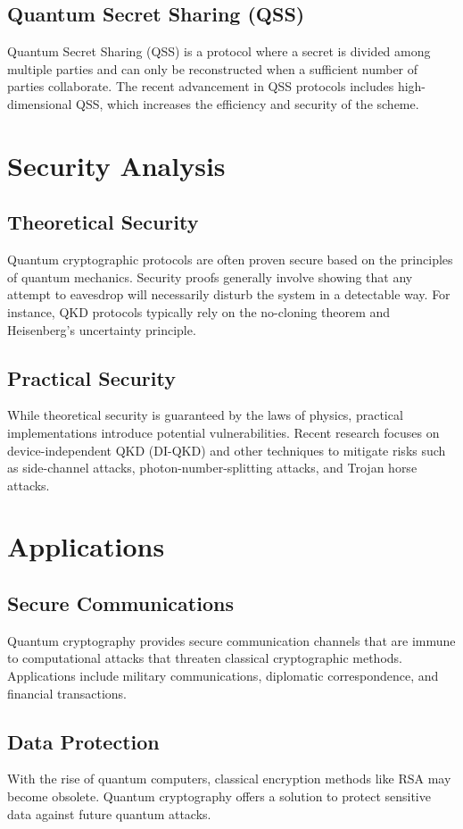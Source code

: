 \documentclass[12pt]{article}
\begin{document}
\subsection{Quantum Secret Sharing (QSS)}
Quantum Secret Sharing (QSS) is a protocol where a secret is divided among multiple parties and can only be reconstructed when a sufficient number of parties collaborate. The recent advancement in QSS protocols includes high-dimensional QSS, which increases the efficiency and security of the scheme.

\section{Security Analysis}
\subsection{Theoretical Security}
Quantum cryptographic protocols are often proven secure based on the principles of quantum mechanics. Security proofs generally involve showing that any attempt to eavesdrop will necessarily disturb the system in a detectable way. For instance, QKD protocols typically rely on the no-cloning theorem and Heisenberg's uncertainty principle.

\subsection{Practical Security}
While theoretical security is guaranteed by the laws of physics, practical implementations introduce potential vulnerabilities. Recent research focuses on device-independent QKD (DI-QKD) and other techniques to mitigate risks such as side-channel attacks, photon-number-splitting attacks, and Trojan horse attacks.

\section{Applications}
\subsection{Secure Communications}
Quantum cryptography provides secure communication channels that are immune to computational attacks that threaten classical cryptographic methods. Applications include military communications, diplomatic correspondence, and financial transactions.

\subsection{Data Protection}
With the rise of quantum computers, classical encryption methods like RSA may become obsolete. Quantum cryptography offers a solution to protect sensitive data against future quantum attacks.
\end{document}
